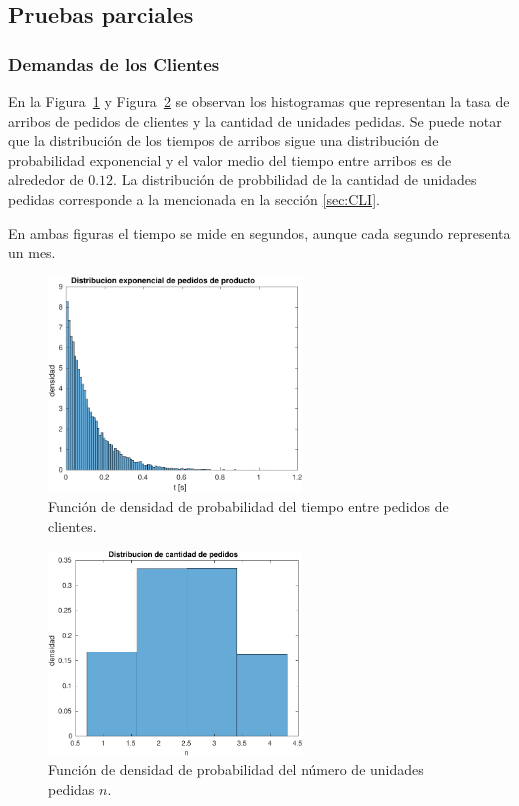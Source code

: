 \documentclass[10pt]{article}
\begin{document}
\subsection{Pruebas parciales\label{sec:PP}}


 
\subsubsection{Demandas de los Clientes} 
 
En la Figura~\ref{fig:pdftiempo} y Figura~\ref{fig:pdfpedidos} se observan los histogramas que representan la tasa de arribos de pedidos de clientes y la cantidad de unidades pedidas. Se puede notar que la distribución de los tiempos de arribos sigue una distribución de probabilidad exponencial y el valor medio del tiempo entre arribos es de alrededor de $0.12$. La distribución de probbilidad de la cantidad de unidades pedidas corresponde a la mencionada en la sección \ref{sec:CLI}. 

En ambas figuras el tiempo se mide en segundos, aunque cada segundo representa un mes. 
 
\begin{figure} 
\centering 
\includegraphics[width=0.6\textwidth]{img/pdf_tiempo_pedidos} 
\caption{Función de densidad de probabilidad del tiempo entre pedidos de clientes.} 
\label{fig:pdftiempo} 
\end{figure} 
 
\begin{figure} 
\centering 
\includegraphics[width=0.6\textwidth]{img/pdf_cantidad_pedidos} 
\caption{Función de densidad de probabilidad del número de unidades pedidas $n$.} 
\label{fig:pdfpedidos} 
\end{figure}
\FloatBarrier
\end{document}
